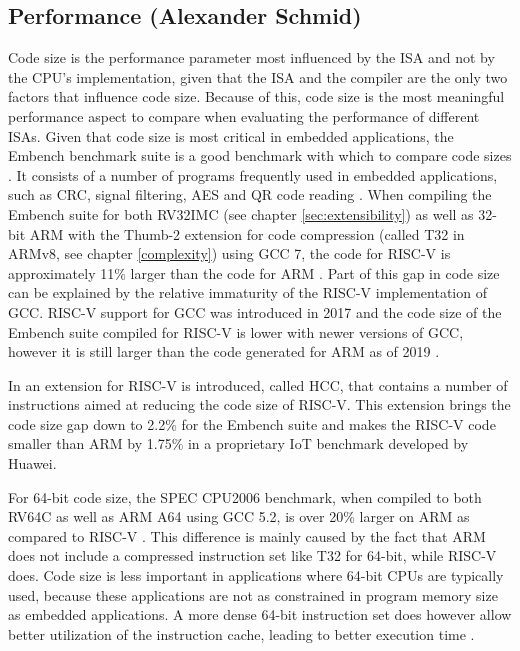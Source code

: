 \documentclass[conference]{IEEEtran}
\begin{document}
	\subsection{Performance (Alexander Schmid)}
	\label{performance}
	Code size is the performance parameter most influenced by the \gls{ISA} and not by the \gls{CPU}'s implementation,
	given that the \gls{ISA} and the compiler are the only two factors that influence code size.
	Because of this, code size is the most meaningful performance aspect to compare when evaluating the performance of different \glspl{ISA}.
	Given that code size is most critical in embedded applications, the Embench benchmark suite is a good benchmark
	with which to compare code sizes \cite{Patterson2019}. It consists of a number of programs frequently used in embedded
	applications, such as CRC, signal filtering, AES and QR code reading \cite{Patterson2019}.
	When compiling the Embench suite for both RV32IMC (see chapter \ref{sec:extensibility}) as well as 32-bit ARM with the Thumb-2 extension for code compression (called T32 in ARMv8, see chapter \ref{complexity}) using GCC 7,
	the code for RISC-V is approximately 11\% larger than the code for ARM \cite{Perotti2020}.
	Part of this gap in code size can be explained by the relative immaturity of the RISC-V implementation of
	GCC. RISC-V support for GCC was introduced in 2017 and the code size of the Embench suite
	compiled for RISC-V is lower with newer versions of GCC, however it is still larger than the code generated for ARM as of 2019 \cite{Patterson2019}.

	In \cite{Perotti2020} an extension for RISC-V is introduced, called HCC, that contains a number of instructions
	aimed at reducing the code size of RISC-V. This extension brings the code size gap down to 2.2\% for the Embench suite
	and makes the RISC-V code smaller than ARM by 1.75\% in a proprietary IoT benchmark developed by Huawei. \cite{Perotti2020}
	
	For 64-bit code size, the SPEC CPU2006 benchmark, when compiled to both RV64C as well as ARM A64 using GCC 5.2,
	is over 20\% larger on ARM as compared to RISC-V \cite[page 62]{Waterman2016}.
	This difference is mainly caused by the fact that ARM does not include a compressed instruction set like T32 for 64-bit, while RISC-V does.
	Code size is less important in applications where 64-bit \glspl{CPU} are typically used, because these applications
	are not as constrained in program memory size as embedded applications. A more dense 64-bit instruction set does however allow better utilization of the instruction cache,
	leading to better execution time \cite[slide 46]{Celio2016}.
\end{document}
